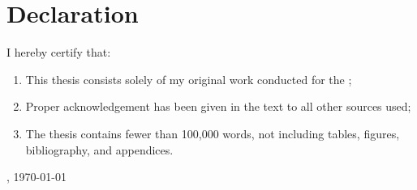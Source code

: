 \newpage
\section*{\Large Declaration}


I hereby certify that:
\begin{enumerate}
    \item This thesis consists solely of my original work conducted for the \thesisdegree;
    \item Proper acknowledgement has been given in the text to all other sources used;
    \item The thesis contains fewer than 100{,}000 words, not including tables, figures, bibliography, and appendices.
\end{enumerate}

\vspace{1cm}


\noindent \thesisauthor, {\monthyear\today}
